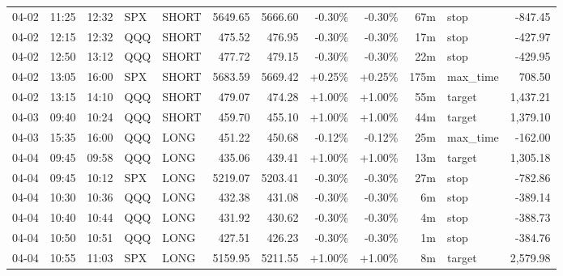 \documentclass[11pt,a4paper]{article}
\begin{document}
\begin{center}
\begin{longtable}{>{\color{txtmain}}l l l l l r r r r r >{\color{txtmain}}l r}
04-02 & 11:25 & 12:32 & SPX & SHORT & 5649.65 & 5666.60 & \textcolor{lossred}{-0.30\%} & \textcolor{lossred}{-0.30\%} & 67m & stop & \textcolor{lossred}{-847.45} \\
04-02 & 12:15 & 12:32 & QQQ & SHORT & 475.52 & 476.95 & \textcolor{lossred}{-0.30\%} & \textcolor{lossred}{-0.30\%} & 17m & stop & \textcolor{lossred}{-427.97} \\
04-02 & 12:50 & 13:12 & QQQ & SHORT & 477.72 & 479.15 & \textcolor{lossred}{-0.30\%} & \textcolor{lossred}{-0.30\%} & 22m & stop & \textcolor{lossred}{-429.95} \\
04-02 & 13:05 & 16:00 & SPX & SHORT & 5683.59 & 5669.42 & \textcolor{wingreen}{+0.25\%} & \textcolor{wingreen}{+0.25\%} & 175m & max\_time & \textcolor{wingreen}{708.50} \\
04-02 & 13:15 & 14:10 & QQQ & SHORT & 479.07 & 474.28 & \textcolor{wingreen}{+1.00\%} & \textcolor{wingreen}{+1.00\%} & 55m & target & \textcolor{wingreen}{1,437.21} \\
04-03 & 09:40 & 10:24 & QQQ & SHORT & 459.70 & 455.10 & \textcolor{wingreen}{+1.00\%} & \textcolor{wingreen}{+1.00\%} & 44m & target & \textcolor{wingreen}{1,379.10} \\
04-03 & 15:35 & 16:00 & QQQ & LONG & 451.22 & 450.68 & \textcolor{lossred}{-0.12\%} & \textcolor{lossred}{-0.12\%} & 25m & max\_time & \textcolor{lossred}{-162.00} \\
04-04 & 09:45 & 09:58 & QQQ & LONG & 435.06 & 439.41 & \textcolor{wingreen}{+1.00\%} & \textcolor{wingreen}{+1.00\%} & 13m & target & \textcolor{wingreen}{1,305.18} \\
04-04 & 09:45 & 10:12 & SPX & LONG & 5219.07 & 5203.41 & \textcolor{lossred}{-0.30\%} & \textcolor{lossred}{-0.30\%} & 27m & stop & \textcolor{lossred}{-782.86} \\
04-04 & 10:30 & 10:36 & QQQ & LONG & 432.38 & 431.08 & \textcolor{lossred}{-0.30\%} & \textcolor{lossred}{-0.30\%} & 6m & stop & \textcolor{lossred}{-389.14} \\
04-04 & 10:40 & 10:44 & QQQ & LONG & 431.92 & 430.62 & \textcolor{lossred}{-0.30\%} & \textcolor{lossred}{-0.30\%} & 4m & stop & \textcolor{lossred}{-388.73} \\
04-04 & 10:50 & 10:51 & QQQ & LONG & 427.51 & 426.23 & \textcolor{lossred}{-0.30\%} & \textcolor{lossred}{-0.30\%} & 1m & stop & \textcolor{lossred}{-384.76} \\
04-04 & 10:55 & 11:03 & SPX & LONG & 5159.95 & 5211.55 & \textcolor{wingreen}{+1.00\%} & \textcolor{wingreen}{+1.00\%} & 8m & target & \textcolor{wingreen}{2,579.98} \\

\end{longtable}
\end{center}
\end{document}
